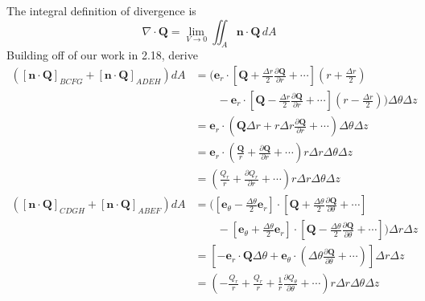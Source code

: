 \documentclass[a4paper]{article}
\begin{document}
\vspace{12pt}


The integral definition of divergence is 
\[
	\nabla \cdot \pmb{Q} = \lim\limits_{V \to 0}\iint_{A} \pmb{n} \cdot \pmb{Q} \, dA 
\]
Building off of our work in 2.18, derive
\begin{align*}
	\!\left( \!\left[ \pmb{n} \cdot \pmb{Q} \right]_{BCFG} + \!\left[ \pmb{n} \cdot \pmb{Q} \right]_{ADEH} \right)dA & = \biggl( \pmb{e}_{r} \cdot \!\left[ \pmb{Q} + \frac{\Delta r}{2}\frac{\partial \pmb{Q}}{\partial r} + \cdots \right]\!\left( r + \frac{\Delta r}{2} \right) \\
												       & \qquad - \pmb{e}_{r} \cdot \!\left[ \pmb{Q} - \frac{\Delta r}{2}\frac{\partial \pmb{Q}}{\partial r} + \cdots \right]\!\left( r - \frac{\Delta r}{2} \right) \biggr) \Delta \theta \Delta z \\
												       & = \pmb{e}_{r} \cdot \!\left( \pmb{Q} \Delta r + r \Delta r \frac{\partial \pmb{Q}}{\partial r} + \cdots \right) \Delta \theta \Delta z \\
												       & = \pmb{e}_{r} \cdot \!\left( \frac{\pmb{Q}}{r} + \frac{\partial \pmb{Q}}{\partial r} + \cdots \right)r \Delta r \Delta \theta \Delta z \\
												       & = \!\left( \frac{Q_{r}}{r} + \frac{\partial Q_{r}}{\partial r} + \cdots \right)r \Delta r \Delta \theta \Delta z \\
	\!\left( \!\left[ \pmb{n} \cdot \pmb{Q} \right]_{CDGH} + \!\left[ \pmb{n} \cdot \pmb{Q} \right]_{ABEF} \right)dA & = \biggl( \!\left[ \pmb{e}_{\theta} - \frac{\Delta \theta}{2}\pmb{e}_{r} \right] \cdot \!\left[ \pmb{Q} + \frac{\Delta \theta}{2}\frac{\partial \pmb{Q}}{\partial \theta} + \cdots \right] \\
												       & \qquad - \!\left[ \pmb{e}_{\theta} + \frac{\Delta \theta}{2}\pmb{e}_{r} \right] \cdot \!\left[ \pmb{Q} - \frac{\Delta \theta}{2}\frac{\partial \pmb{Q}}{\partial \theta} + \cdots \right] \biggr)\Delta r \Delta z \\
												       & = \!\left[ -\pmb{e}_{r} \cdot \pmb{Q} \Delta \theta + \pmb{e}_{\theta} \cdot \!\left( \Delta \theta \frac{\partial \pmb{Q}}{\partial \theta} + \cdots \right) \right] \Delta r \Delta z \\ 
												       & = \!\left( -\frac{Q_{r}}{r} + \frac{Q_{r}}{r} + \frac{1}{r}\frac{\partial Q_{\theta}}{\partial \theta} + \cdots \right) r \Delta r \Delta \theta \Delta z \\

\end{align*}
\end{document}
